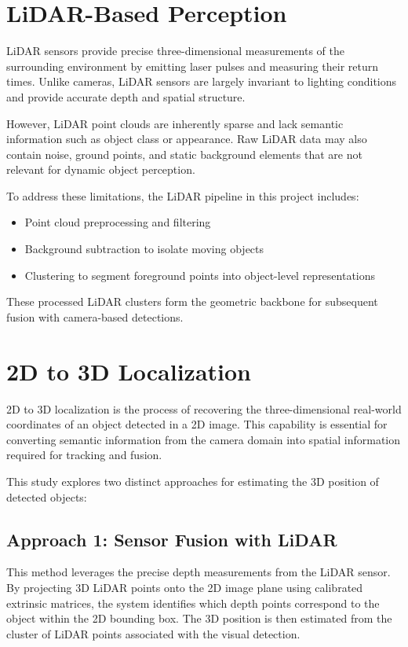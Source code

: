 \documentclass[12pt,a4paper]{report}
\begin{document}
\section{LiDAR-Based Perception}
LiDAR sensors provide precise three-dimensional measurements of the surrounding environment by emitting laser pulses and measuring their return times. Unlike cameras, LiDAR sensors are largely invariant to lighting conditions and provide accurate depth and spatial structure.

However, LiDAR point clouds are inherently sparse and lack semantic information such as object class or appearance. Raw LiDAR data may also contain noise, ground points, and static background elements that are not relevant for dynamic object perception.

To address these limitations, the LiDAR pipeline in this project includes:
\begin{itemize}
    \item Point cloud preprocessing and filtering
    \item Background subtraction to isolate moving objects
    \item Clustering to segment foreground points into object-level representations
\end{itemize}
These processed LiDAR clusters form the geometric backbone for subsequent fusion with camera-based detections.


\section{2D to 3D Localization}
2D to 3D localization is the process of recovering the three-dimensional real-world coordinates of an object detected in a 2D image. This capability is essential for converting semantic information from the camera domain into spatial information required for tracking and fusion.

This study explores two distinct approaches for estimating the 3D position of detected objects:

\subsection{Approach 1: Sensor Fusion with LiDAR}
This method leverages the precise depth measurements from the LiDAR sensor. By projecting 3D LiDAR points onto the 2D image plane using calibrated extrinsic matrices, the system identifies which depth points correspond to the object within the 2D bounding box. The 3D position is then estimated from the cluster of LiDAR points associated with the visual detection.
\end{document}
